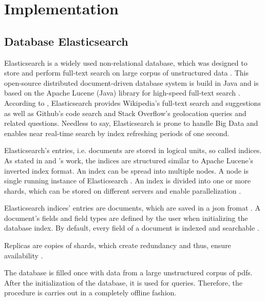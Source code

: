 \newcommand{\databaseName}{Elasticsearch}
\chapter{Implementation}\label{ch:implementation}

\section{Database Elasticsearch}\label{subsec:db}
\databaseName{} is a widely used non-relational database, which was designed to store and perform full-text search on large corpus of unstructured data \cite{Elasticsearch2017}.
This open-source distributed document-driven database system is build in Java and is based on the Apache Lucene (Java) library for high-speed full-text search \cite{Elasticsearch2017,Elasticsearch2019}.
According to \cite{Elasticsearch2019}, \databaseName{} provides Wikipedia's full-text search and suggestions as well as Github's code search and Stack Overflow's geolocation queries and related questions.
Needless to say, \databaseName{} is prone to handle Big Data and enables near real-time search by index refreshing periods of one second.

\databaseName{}'s entries, i.e. documents are stored in logical units, so called indices.
As stated in \citeauthor{Elasticsearch2019} and \citeauthor{Elasticsearch2017}'s work, the indices are structured similar to Apache Lucene's inverted index format.
An index can be spread into multiple nodes.
A node is single running instance of \databaseName{} \cite{Elasticsearch2019}.
An index is divided into one or more shards, which can be stored on different servers and enable parallelization \cite{Elasticsearch2019}.

\databaseName{} indices' entries are documents, which are saved in a \ac{json} fromat \cite{Elasticsearch2017}.
A document's fields and field types are defined by the user when initializing the database index.
By default, every field of a document is indexed and searchable \cite{Elasticsearch2019}.

Replicas are copies of shards, which create redundancy and thus, ensure availability \cite{Elasticsearch2019}.


The database is filled once with data from a large unstructured corpus of \acp{pdf}.
After the initialization of the database, it is used for queries. 
Therefore, the procedure is carries out in a completely offline fashion.

